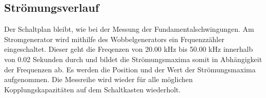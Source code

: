 \subsection{Strömungsverlauf}
Der Schaltplan bleibt, wie bei der Messung der Fundamentalschwingungen. Am Stromgenerator wird mithilfe des Wobbelgenerators ein Frquenzzähler
eingeschaltet. Dieser geht die Freqenzen von 20.00 kHz bis 50.00 kHz innerhalb von 0.02 Sekunden durch und bildet die Strömungsmaxima somit in
Abhängigkeit der Frequenzen ab. Es werden die Position und der Wert der Strömungsmaxima aufgenommen. Die Messreihe wird wieder für alle
möglichen Kopplungskapazitäten auf dem Schaltkasten wiederholt.